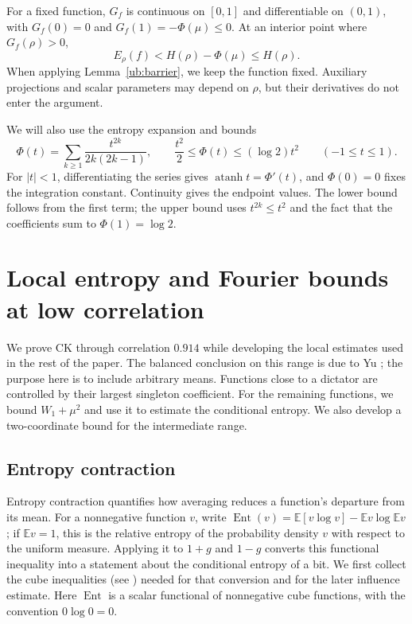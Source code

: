 \documentclass[11pt,letterpaper]{amsart}
\newcommand{\E}{\mathbb E}
\newcommand{\1}{\mathbf 1}
\DeclareMathOperator{\Ent}{Ent}
\DeclareMathOperator{\atanh}{atanh}
\numberwithin{equation}{section}
\begin{document}
For a fixed function, $G_f$ is continuous on $[0,1]$ and
differentiable on $(0,1)$, with
$G_f(0)=0$ and $G_f(1)=-\Phi(\mu)\le0$.
At an interior point where $G_f(\rho)>0$,
\[
 E_\rho(f)<H(\rho)-\Phi(\mu)\le H(\rho).
\]
When applying Lemma~\ref{ub:barrier}, we keep the function fixed.
Auxiliary projections and scalar parameters may depend on $\rho$,
but their derivatives do not enter the argument.

We will also use the entropy expansion and bounds
\begin{equation}\label{ub:entropy-series}
 \Phi(t)=\sum_{k\ge1}\frac{t^{2k}}{2k(2k-1)},
 \qquad
 \frac{t^2}{2}\le\Phi(t)\le(\log2)t^2
 \qquad(-1\le t\le1).
\end{equation}
For $|t|<1$, differentiating the series gives $\atanh t=\Phi'(t)$,
and $\Phi(0)=0$ fixes the integration constant.
Continuity gives the endpoint values.
The lower bound follows from the first term; the upper bound
uses $t^{2k}\le t^2$ and the fact that the coefficients sum
to $\Phi(1)=\log2$.


\section{Local entropy and Fourier bounds at low correlation}\label{ub:lower}

We prove CK through correlation $0.914$ while developing the local
estimates used in the rest of the paper. The balanced conclusion on
this range is due to Yu \cite{Yu2026Local}; the purpose here is to
include arbitrary means. Functions close to a dictator are controlled by
their largest singleton coefficient. For the remaining functions, we
bound $W_1+\mu^2$ and use it to estimate the conditional entropy.
We also develop a two-coordinate bound for the intermediate range.

\subsection{Entropy contraction}

Entropy contraction quantifies how averaging reduces a function's
departure from its mean. For a nonnegative function $v$, write
$\Ent(v)=\E[v\log v]-\E v\log\E v$; if $\E v=1$, this is the
relative entropy of the probability density $v$ with respect to the
uniform measure. Applying it to $1+g$ and $1-g$ converts this functional
inequality into a statement about the conditional entropy of a bit.
We first collect the cube inequalities (see \cite[Sections~2.3, 9.3, and Exercises~10.23--10.24]{ODonnell2014}) needed for that conversion and
for the later influence estimate. Here $\Ent$ is a scalar functional
of nonnegative cube functions, with the convention $0\log0=0$.
\end{document}
